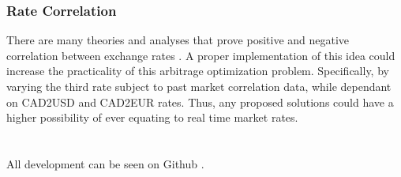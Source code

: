 \documentclass[12pt]{article}
\begin{document}
\subsubsection{Rate Correlation}
There are many theories and analyses that prove positive and negative correlation between exchange rates \cite{corr}. A proper implementation of this idea could increase the practicality of this arbitrage optimization problem. Specifically, by varying the third rate subject to past market correlation data, while dependant on CAD2USD and CAD2EUR rates. Thus, any proposed solutions could have a higher possibility of ever equating to real time market rates.\\\\\\
All development can be seen on Github \cite{ry}.

\newpage
\nocite{*}


\end{document}
